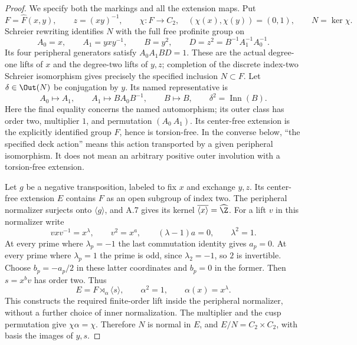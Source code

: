 \begin{proof}
We specify both the markings and all the extension maps.  Put
\[
 F=\widehat F(x,y),\qquad z=(xy)^{-1},\qquad
 \chi:F\longrightarrow C_2,\quad (\chi(x),\chi(y))=(0,1),
 \qquad N=\ker\chi.
                                                        \tag{D.37a}
\]
Schreier rewriting identifies $N$ with the full free profinite
group on
\[
 A_0=x,\qquad A_1=yxy^{-1},\qquad B=y^2,
 \qquad D=z^2=B^{-1}A_1^{-1}A_0^{-1}.
                                                        \tag{D.37b}
\]
Its four peripheral generators satisfy $A_0A_1BD=1$.
These are the actual degree-one lifts of $x$ and the degree-two
lifts of $y,z$; completion of the discrete index-two Schreier
isomorphism gives precisely the specified inclusion $N\subset F$.
Let $\delta\in\Out(N)$ be conjugation by $y$.  Its named
representative is
\[
 A_0\longmapsto A_1,\qquad
 A_1\longmapsto B A_0 B^{-1},\qquad B\longmapsto B,
 \qquad \delta^2=\operatorname{Inn}(B).
                                                        \tag{D.37c}
\]
Here the final equality concerns the named automorphism;
its outer class has order two, multiplier $1$, and permutation
$(A_0\ A_1)$.  Its center-free extension is the explicitly
identified group $F$, hence is torsion-free.  In the converse
below, ``the specified deck action'' means this action transported
by a given peripheral isomorphism.  It does not mean an arbitrary
positive outer involution with a torsion-free extension.

Let $g$ be a negative transposition, labeled to fix $x$ and
exchange $y,z$.  Its center-free extension $E$ contains $F$
as an open subgroup of index two.  The peripheral normalizer
surjects onto $\langle g\rangle$, and A.7 gives its kernel
$\overline{\langle x\rangle}=\widehat\Z$.
For a lift $v$ in this normalizer write
\[
 v x v^{-1}=x^\lambda,\qquad v^2=x^a,
 \qquad (\lambda-1)a=0,\qquad \lambda^2=1.
                                                        \tag{D.37d}
\]
At every prime where $\lambda_p=-1$ the last commutation
identity gives $a_p=0$.  At every prime where $\lambda_p=1$
the prime is odd, since $\lambda_2=-1$, so $2$ is invertible.
Choose $b_p=-a_p/2$ in these latter coordinates and $b_p=0$
in the former.  Then $s=x^b v$ has order two.  Thus
\[
 E=F\rtimes_\alpha\langle s\rangle,\qquad
 \alpha^2=1,\qquad \alpha(x)=x^\lambda.
                                                        \tag{D.37e}
\]
This constructs the required finite-order lift inside the
peripheral normalizer, without a further choice of inner
normalization.  The multiplier and the cusp permutation give
$\chi\alpha=\chi$.  Therefore $N$ is normal in $E$, and
$E/N=C_2\times C_2$, with basis the images of $y,s$.


\end{proof}
